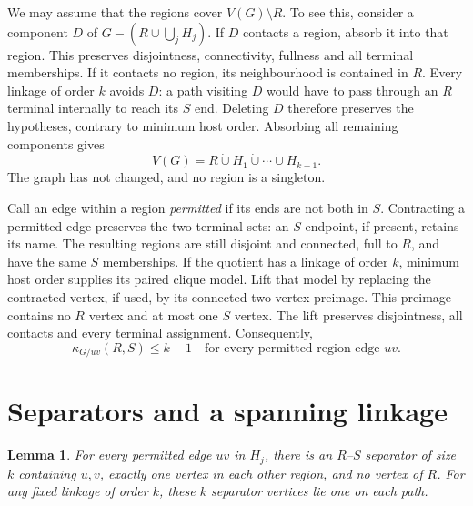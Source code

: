 \documentclass[11pt]{amsart}
\newtheorem{lemma}[theorem]{Lemma}
\begin{document}
We may assume that the regions cover $V(G)\setminus R$. To see this,
consider a component $D$ of
$G-(R\cup\bigcup_j H_j)$. If $D$ contacts a region, absorb it into
that region. This preserves disjointness, connectivity, fullness and
all terminal memberships. If it contacts no region, its neighbourhood
is contained in $R$. Every linkage of order $k$ avoids $D$: a path
visiting $D$ would have to pass through an $R$ terminal internally to
reach its $S$ end. Deleting $D$ therefore preserves the hypotheses,
contrary to minimum host order. Absorbing all remaining components gives
\begin{equation}\label{eq:partition}
 V(G)=R\mathbin{\dot\cup}H_1\mathbin{\dot\cup}\cdots
       \mathbin{\dot\cup}H_{k-1}.
\end{equation}
The graph has not changed, and no region is a singleton.

Call an edge within a region \emph{permitted} if its ends are not both
in $S$. Contracting a permitted edge preserves the two terminal sets:
an $S$ endpoint, if present, retains its name. The resulting regions
are still disjoint and connected, full to $R$, and have the same $S$
memberships. If the quotient has a linkage of order $k$, minimum host
order supplies its paired clique model. Lift that model by replacing
the contracted vertex, if used, by its connected two-vertex preimage.
This preimage contains no $R$ vertex and at most one $S$ vertex. The
lift preserves disjointness, all contacts and every terminal assignment.
Consequently,
\begin{equation}\label{eq:failed-contraction}
 \kappa_{G/uv}(R,S)\leq k-1
 \quad\text{for every permitted region edge }uv.
\end{equation}

\section{Separators and a spanning linkage}\label{sec:separators}

\begin{lemma}\label{lem:edge-cut}
For every permitted edge $uv$ in $H_j$, there is an $R$--$S$ separator
of size $k$ containing $u,v$, exactly one vertex in each other region,
and no vertex of $R$. For any fixed linkage of order $k$, these $k$
separator vertices lie one on each path.
\end{lemma}
\end{document}
